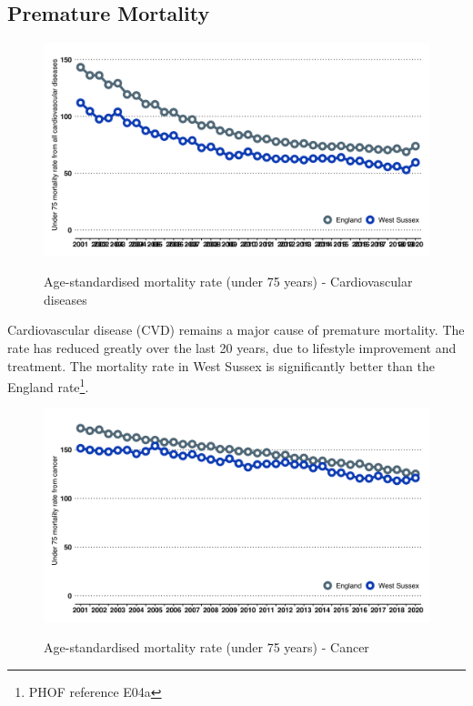 \subsection{Premature Mortality}
\begin{figure}[htp]
    \caption[Age-standardised mortality rate (under 75 years) - Cardiovascular diseases]{Age-standardised mortality rate (under 75 years) - Cardiovascular diseases}
    \centering
    \includegraphics[width=.95\linewidth]{images/u75_cvd_line.png}
    \label{fig:u75_cvd}
\end{figure}

Cardiovascular disease (CVD) remains a major cause of premature mortality. The rate has reduced greatly over the last 20 years, due to lifestyle improvement and treatment. The mortality rate in West Sussex is significantly better than the England rate\footnote{PHOF reference E04a}. 

\begin{figure}[htp]
    \caption[Age-standardised mortality rate (under 75 years) - Cancer]{Age-standardised mortality rate (under 75 years) - Cancer}
    \centering
    \includegraphics[width=.95\linewidth]{images/u75_cancer_line.png}
    \label{fig:u75_cancer}
\end{figure}


